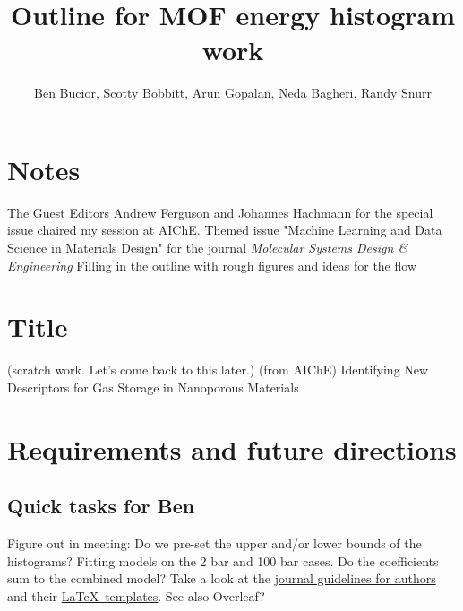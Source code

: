 \documentclass[letterpaper]{article}
\title{Outline for MOF energy histogram work}
\author{Ben Bucior, Scotty Bobbitt, Arun Gopalan, Neda Bagheri, Randy Snurr}
\begin{document}
\maketitle

%

\section{Notes}
\begin{outline}
	\1 The Guest Editors Andrew Ferguson and Johannes Hachmann for the special issue chaired my session at AIChE.
	\1 Themed issue "Machine Learning and Data Science in Materials Design" for the journal \textit{Molecular Systems Design \& Engineering}
	\1 Filling in the outline with rough figures and ideas for the flow
\end{outline}


\section{Title}
\begin{outline}
	\1 (scratch work.  Let's come back to this later.)
	\1 (from AIChE) Identifying New Descriptors for Gas Storage in Nanoporous Materials
\end{outline}

\section{Requirements and future directions}

\subsection{Quick tasks for Ben}
\begin{outline}
	\1 Figure out in meeting: Do we pre-set the upper and/or lower bounds of the histograms?
	\1 Fitting models on the 2 bar and 100 bar cases.  Do the coefficients sum to the combined model?
	\1 Take a look at the \href{http://www.rsc.org/journals-books-databases/about-journals/molecular-systems-design-engineering/#undefined}{journal guidelines for authors} and their \href{http://www.rsc.org/journals-books-databases/journal-authors-reviewers/author-tools-services/#article-templates}{\LaTeX~templates}.  See also Overleaf?
\end{outline}
\end{document}
